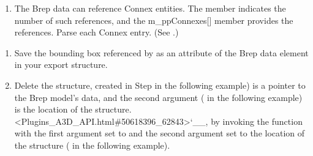 \documentclass[letterpaper,12pt,english,openany,oneside]{sphinxmanual}
\begin{document}
\begin{sphinxVerbatim}[commandchars=\\\{\}]
 
    
\end{sphinxVerbatim}
\begin{enumerate}
%
\setcounter{enumi}{2}
\item {} 
The Brep data can reference Connex entities. The  member indicates the number of such references, and the m\_ppConnexes{[}{]} member provides the references. Parse each Connex entry. (See .)

\end{enumerate}

\begin{sphinxVerbatim}[commandchars=\\\{\}]
       
  \PYG{p}{[}\PYG{p}{]}
\end{sphinxVerbatim}
\begin{enumerate}
%
\setcounter{enumi}{3}
\item {} 
Save the bounding box referenced by  as an attribute of the Brep data element in your export structure.

\item {} 
Delete the  structure, created in Step  in the following example) is a pointer to the Brep model’s data, and the second argument ( in the following example) is the location of the  structure. <Plugins\_A3D\_API.html\#50618396\_62843>`\_\_, by invoking the  function with the first argument set to  and the second argument set to the location of the structure ( in the following example).

\end{enumerate}
\end{document}
